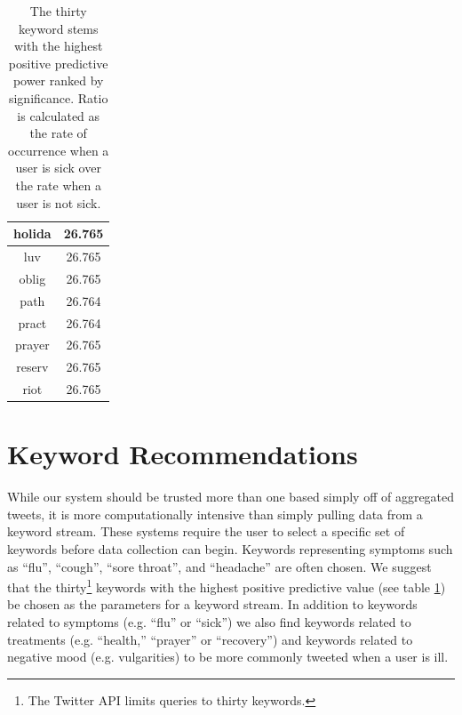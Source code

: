 \documentclass{acm_proc_article-sp}
\begin{document}
\begin{table}[!ht]
\begin{tabular}{|c|c|}
holida & 26.765 \\ \hline
luv & 26.765 \\ \hline
oblig & 26.765 \\ \hline
path & 26.764 \\ \hline
pract & 26.764 \\ \hline
prayer & 26.765 \\ \hline
reserv & 26.765 \\ \hline
riot & 26.765 \\ 
\hline\end{tabular}
\caption{The thirty keyword stems with the highest positive predictive power ranked by significance. Ratio is calculated as the rate of occurrence when a user is sick over the rate when a user is not sick.}
\label{tab:thirty_best}
\end{table}

\section{Keyword Recommendations}


While our system should be trusted more than one based simply off of aggregated tweets, it is more computationally intensive than simply pulling data from a keyword stream. These systems require the user to select a specific set of keywords before data collection can begin. Keywords representing symptoms such as ``flu'', ``cough'', ``sore throat'', and ``headache'' are often chosen. We suggest that the thirty\footnote{The Twitter API limits queries to thirty keywords.} keywords with the highest positive predictive value (see table \ref{tab:thirty_best}) be chosen as the parameters for a keyword stream. In addition to keywords related to symptoms (e.g. ``flu'' or ``sick'') we also find keywords related to treatments (e.g. ``health,'' ``prayer'' or ``recovery'') and keywords related to negative mood (e.g. vulgarities) to be more commonly tweeted when a user is ill. 


\balancecolumns

\end{document}
